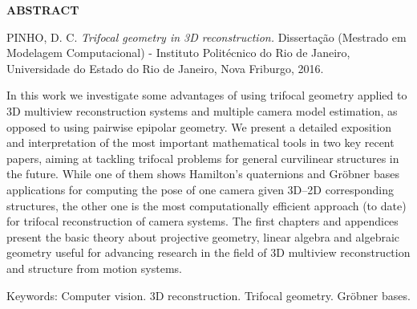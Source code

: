 \begin{center}
{\bf ABSTRACT}
\end{center}

\vspace{1.5 cm}

\begin{center}
\begin{minipage}{1\textwidth}
\noindent PINHO, D. C. {\it Trifocal geometry in 3D reconstruction.} Dissertação (Mestrado em Modelagem Computacional) - Instituto Politécnico do Rio de Janeiro, Universidade do Estado do Rio de Janeiro, Nova Friburgo, 2016.
\end{minipage}
\end{center}

\begin{center}
\begin{minipage}{1\textwidth}
\qquad In this work we investigate some advantages of using trifocal geometry applied to 3D multiview reconstruction systems and multiple camera model estimation, as opposed to using pairwise epipolar geometry. We present a detailed exposition and interpretation of the most important mathematical tools in two key recent papers, aiming at tackling trifocal problems for general curvilinear structures in the future. While one of them shows Hamilton's quaternions and Gr\"obner bases applications for computing the pose of one camera given 3D--2D corresponding structures, the other one is the most computationally efficient approach (to date) for trifocal reconstruction of camera systems. The first chapters and appendices present the basic theory about projective geometry, linear algebra and algebraic geometry useful for advancing research in the field of 3D multiview reconstruction and structure from motion systems.
\end{minipage}
\end{center}

\begin{flushleft}
Keywords: Computer vision. 3D reconstruction. Trifocal geometry. Gr\"obner bases. 
\end{flushleft}
\newpage